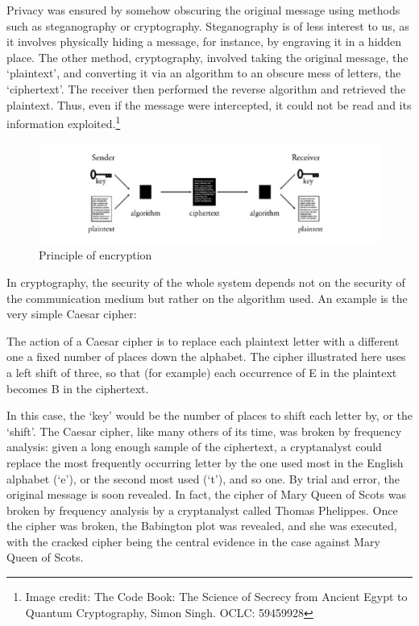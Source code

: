 \documentclass{article}
\begin{document}
Privacy was ensured by somehow obscuring the original message using methods such as steganography or
cryptography. Steganography is of less interest to us, as it involves physically hiding a message,
for instance, by engraving it in a hidden place. The other method, cryptography, involved taking the
original message, the `plaintext', and converting it via an algorithm to an obscure mess of letters,
the `ciphertext'. The receiver then performed the reverse algorithm and retrieved the plaintext.
Thus, even if the message were intercepted, it could not be read and its information exploited.\footnote{Image
credit: The Code Book: The Science of Secrecy from Ancient Egypt to Quantum Cryptography, Simon
Singh. OCLC: 59459928}

\begin{figure}[H]
  \centering
  \includegraphics[scale=0.3]{cryp.png}
  \caption{Principle of encryption}
\end{figure}

In cryptography, the security of the whole system depends not on the security of the communication
medium but rather on the algorithm used. An example is the very simple Caesar cipher\cite{caesar}:

\begin{displayquote}
  The action of a Caesar cipher is to replace each plaintext letter with a different one a fixed
number of places down the alphabet. The cipher illustrated here uses a left shift of three, so that
(for example) each occurrence of E in the plaintext becomes B in the ciphertext.
\end{displayquote}


In this case, the `key' would be the number of places to shift each letter by, or the `shift'. The
Caesar cipher, like many others of its time, was broken by frequency analysis: given a long enough
sample of the ciphertext, a cryptanalyst could replace the most frequently occurring letter by the
one used most in the English alphabet (`e'), or the second most used (`t'), and so one. By trial and
error, the original message is soon revealed. In fact, the cipher of Mary Queen of Scots was broken
by frequency analysis by a cryptanalyst called Thomas Phelippes. Once the cipher was broken, the
Babington plot was revealed, and she was executed, with the cracked cipher being the central
evidence in the case against Mary Queen of Scots.
\end{document}
